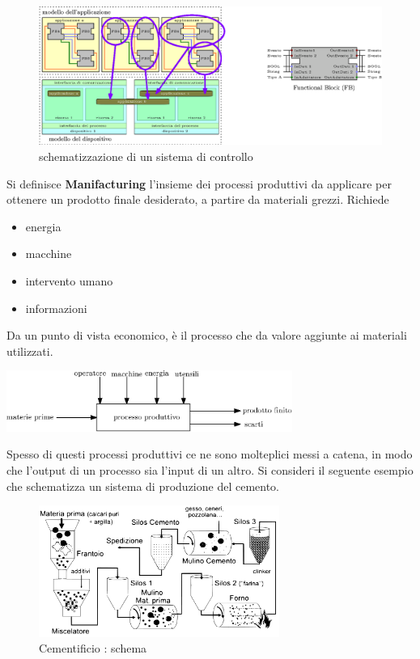 \documentclass[10pt, letterpaper]{report}
\begin{document}
\begin{figure}[h!]
    \centering
    \includegraphics[width=1\textwidth ]{images/sistemaControllo.eps}
    \caption{schematizzazione di un sistema di controllo}
    \label{fig:siscon}
\end{figure} 
Si definisce \textbf{Manifacturing} l'insieme dei processi 
produttivi da applicare per ottenere un prodotto finale desiderato, a partire 
da materiali grezzi. Richiede \begin{itemize}
    \item energia 
    \item macchine 
    \item intervento umano 
    \item informazioni
\end{itemize}
Da un punto di vista economico, è il processo che da valore aggiunte 
ai materiali utilizzati.\begin{center}
    \includegraphics[width=0.7\textwidth ]{images/manifacturing.eps}
\end{center}
Spesso di questi processi produttivi ce ne sono molteplici messi a catena, in modo che l'output di un 
processo sia l'input di un altro. Si consideri il seguente esempio che schematizza un sistema di produzione del cemento.
\begin{figure}[h!]
    \centering
    \includegraphics[width=0.7\textwidth ]{images/cementificio.pdf}
    \caption{Cementificio : schema}
    \label{fig:cementificio}
\end{figure} 
\end{document}
